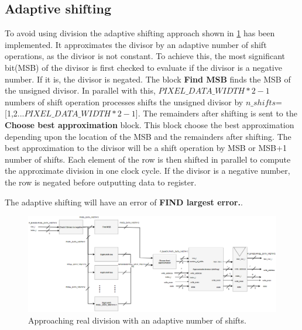 \subsection{Adaptive shifting}
\label{sec:adaptive_shifting}
        To avoid using division the adaptive shifting approach shown in \ref{fig:adaptive_shifting} has been implemented. It approximates the divisor by an adaptive number of shift operations, as the divisor is not constant. To achieve this, the most significant bit(MSB) of the divisor is first checked to evaluate if the divisor is a negative number. If it is, the divisor is negated. The block \textbf{Find MSB} finds the MSB of the unsigned divisor. In parallel with this, $PIXEL\_DATA\_WIDTH*2-1$ numbers of shift operation processes shifts the unsigned divisor by $n\_shifts$=[1,2...$PIXEL\_DATA\_WIDTH*2-1$]. The remainders after shifting is sent to the \textbf{Choose best approximation} block. This block choose the best approximation depending upon the location of the MSB and the remainders after shifting. The best approximation to the divisor will be a shift operation by MSB or MSB+1 number of shifts. Each element of the row is then shifted in parallel to compute the approximate division in one clock cycle. If the divisor is a negative number, the row is negated before outputting data to register.


The adaptive shifting will have an error of \textbf{FIND largest error.}. 



\begin{figure}[H]
\centering
   \includegraphics[scale=0.5]{images/approximate_division/last_division.PNG}
  \caption{Approaching real division with an adaptive number of shifts.  } 
  \label{fig:adaptive_shifting}
\end{figure}